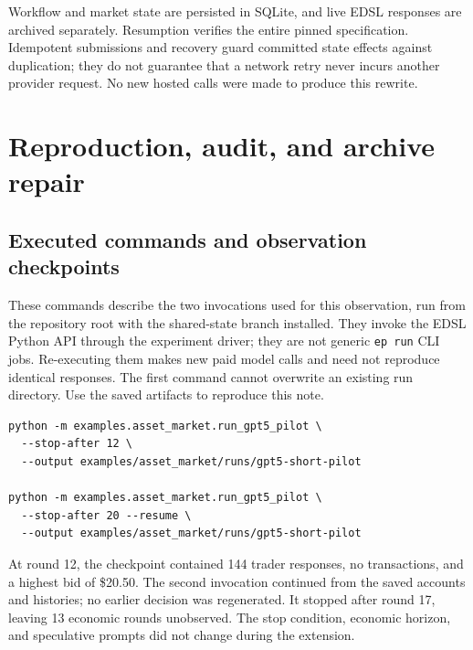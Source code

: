 \documentclass[11pt,letterpaper]{article}
\newcommand{\code}[1]{\texttt{\small #1}}
\begin{document}
Workflow and market state are persisted in SQLite, and live EDSL responses
are archived separately. Resumption verifies the entire pinned specification.
Idempotent submissions and recovery guard committed state effects against
duplication; they do not guarantee that a network retry never incurs another
provider request. No new hosted calls were made to produce this rewrite.

\clearpage
\section{Reproduction, audit, and archive repair}\label{app:reproduce}
\subsection{Executed commands and observation checkpoints}
These commands describe the two invocations used for this observation, run
from the repository root with the shared-state branch installed. They invoke
the EDSL Python API through the experiment driver; they are not generic
\code{ep run} CLI jobs. Re-executing them makes new paid model calls and need
not reproduce identical responses. The first command cannot overwrite an
existing run directory. Use the saved artifacts to reproduce this note.

\begin{lstlisting}[language={},numbers=none]
python -m examples.asset_market.run_gpt5_pilot \
  --stop-after 12 \
  --output examples/asset_market/runs/gpt5-short-pilot

python -m examples.asset_market.run_gpt5_pilot \
  --stop-after 20 --resume \
  --output examples/asset_market/runs/gpt5-short-pilot
\end{lstlisting}

At round 12, the checkpoint contained 144 trader responses, no transactions,
and a highest bid of \$20.50. The second invocation continued from the saved
accounts and histories; no earlier decision was regenerated. It stopped after
round 17, leaving 13 economic rounds unobserved. The stop condition, economic
horizon, and speculative prompts did not change during the extension.
\end{document}
